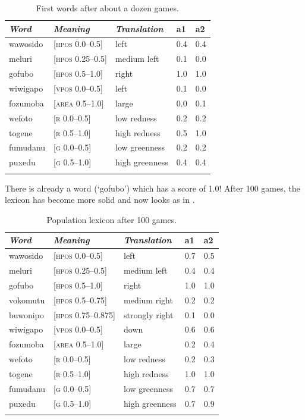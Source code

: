 \begin{table}
\begin{center}
\begin{tabular}{lllll}
\lsptoprule
{\itshape Word}&{\itshape Meaning}&{\itshape Translation} & {\bfshape a1}&{\bfshape a2} \\ \midrule
wawosido & [\textsc{hpos} 0.0–0.5] &left&0.4&0.4\\ 
meluri & [\textsc{hpos} 0.25–0.5] &medium left&0.1&0.0\\ 
gofubo & [\textsc{hpos} 0.5–1.0]& right&1.0&1.0\\ 
wiwigapo & [\textsc{vpos} 0.0–0.5] &left&0.1&0.0\\ 
fozumoba & [\textsc{area} 0.5–1.0]&large & 0.0&0.1\\ 
wefoto & [\textsc{r} 0.0–0.5]& low redness &0.2&0.2\\ 
togene & [\textsc{r} 0.5–1.0]& high redness &0.5&1.0\\ 
fumudanu & [\textsc{g} 0.0–0.5]& low greenness &0.2&0.2\\ 
puxedu & [\textsc{g} 0.5–1.0]& high greenness &0.4&0.4\\ 
\lspbottomrule
\end{tabular}
\caption{\label{tab:game50}First words after about a dozen games.}
\end{center}
\end{table}

There is already a word (`gofubo') which has
a score of 1.0! After 100 games, the lexicon has become more 
solid and now looks as in .    


\begin{table}
\begin{center}
\begin{tabular}{lllll}
\lsptoprule
{\itshape Word}&{\itshape Meaning}&{\itshape Translation} & {\bfshape a1}&{\bfshape a2} \\ \midrule
wawosido & [\textsc{hpos} 0.0–0.5] &left&0.7&0.5\\ 
meluri & [\textsc{hpos} 0.25–0.5] &medium left&0.4&0.4\\ 
gofubo & [\textsc{hpos} 0.5–1.0]& right&1.0&1.0\\ 
vokomutu & [\textsc{hpos} 0.5–0.75] &medium right&0.2&0.2\\ 
buwonipo & [\textsc{hpos} 0.75–0.875] &strongly right&0.1&0.0\\ 
wiwigapo & [\textsc{vpos} 0.0–0.5] &down&0.6&0.6\\ 
fozumoba & [\textsc{area} 0.5–1.0]&large & 0.2&0.4\\ 
wefoto & [\textsc{r} 0.0–0.5]& low redness &0.2&0.3\\ 
togene & [\textsc{r} 0.5–1.0]& high redness &1.0&1.0\\ 
fumudanu & [\textsc{g} 0.0–0.5]& low greenness &0.7&0.7\\ 
puxedu & [\textsc{g} 0.5–1.0]& high greenness &0.7&0.9\\ 
\lspbottomrule
\end{tabular}
\caption{\label{tab:goubo}Population lexicon after 100 games.}
\end{center}
\end{table}


